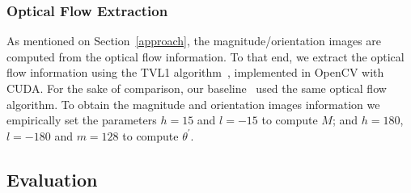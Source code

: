 \documentclass[10pt,conference]{IEEEtran}
\begin{document}
\subsubsection{Optical Flow Extraction}

As mentioned on Section~\ref{approach}, the magnitude/orientation images are computed from the optical flow information. To that end, we extract the optical flow information using the TVL1 algorithm~\cite{Zach:2007}, implemented in OpenCV with CUDA. For the sake of comparison, our baseline~\cite{Wang:2015} used the same optical flow algorithm. To obtain the magnitude and orientation images information we empirically set the parameters $h = 15$ and $l = -15$ to compute $M$; and $h = 180$, $l = -180$ and $m = 128$ to compute $\theta^{'}$.

\subsection{Evaluation}
\end{document}
